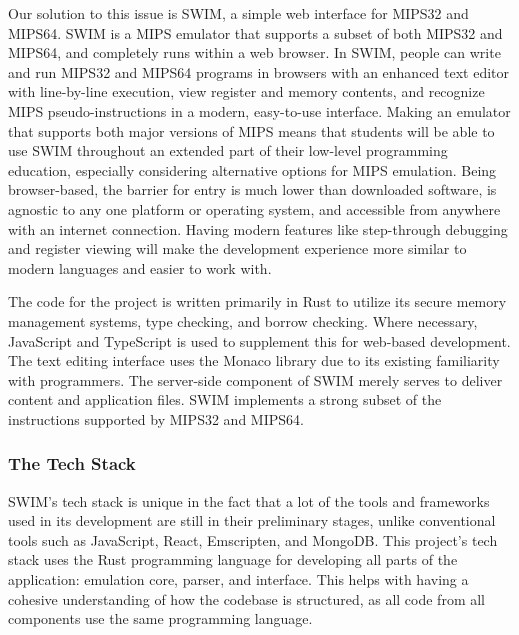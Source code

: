 \documentclass[
    paper=letter,
    parskip=half,
    fontsize=12pt,
    titlepage=firstiscover,
    toc=bibliography,
    numbers=endperiod
]{scrartcl}
\begin{document}
Our solution to this issue is SWIM, a simple web interface for MIPS32
and MIPS64. SWIM is a MIPS emulator that supports a subset of both
MIPS32 and MIPS64, and completely runs within a web browser. In SWIM,
people can write and run MIPS32 and MIPS64 programs in browsers with an
enhanced text editor with line-by-line execution, view register and
memory contents, and recognize MIPS pseudo-instructions in a modern,
easy-to-use interface. Making an emulator that supports both major
versions of MIPS means that students will be able to use SWIM throughout
an extended part of their low-level programming education, especially
considering alternative options for MIPS emulation. Being browser-based,
the barrier for entry is much lower than downloaded software, is
agnostic to any one platform or operating system, and accessible from
anywhere with an internet connection. Having modern features like
step-through debugging and register viewing will make the development
experience more similar to modern languages and easier to work with.

The code for the project is written primarily in Rust \cite{rust-book}
to utilize its secure memory management systems, type checking, and
borrow checking. Where necessary, JavaScript and TypeScript is used to
supplement this for web-based development. The text editing interface
uses the Monaco library \cite{monaco} due to its existing familiarity
with programmers. The server-side component of SWIM merely serves to
deliver content and application files. SWIM implements a strong subset
of the instructions supported by MIPS32 and MIPS64.

\subsubsection{The Tech Stack}
SWIM's tech stack is unique in the fact that a lot of the tools and
frameworks used in its development are still in their preliminary
stages, unlike conventional tools such as JavaScript, React, Emscripten,
and MongoDB. This project's tech stack uses the Rust programming
language for developing all parts of the application: emulation core,
parser, and interface. This helps with having a cohesive understanding
of how the codebase is structured, as all code from all components use
the same programming language.
\end{document}

